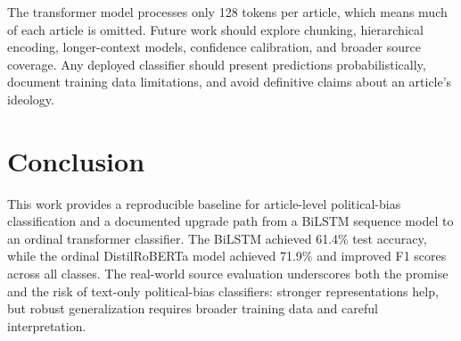 \documentclass[10pt,twocolumn]{article}
\begin{document}
The transformer model processes only 128 tokens per article, which means much
of each article is omitted. Future work should explore chunking, hierarchical
encoding, longer-context models, confidence calibration, and broader source
coverage. Any deployed classifier should present predictions probabilistically,
document training data limitations, and avoid definitive claims about an
article's ideology.

\section{Conclusion}

This work provides a reproducible baseline for article-level political-bias
classification and a documented upgrade path from a BiLSTM sequence model to an
ordinal transformer classifier. The BiLSTM achieved 61.4\% test accuracy, while
the ordinal DistilRoBERTa model achieved 71.9\% and improved F1 scores across
all classes. The real-world source evaluation underscores both the promise and
the risk of text-only political-bias classifiers: stronger representations help,
but robust generalization requires broader training data and careful
interpretation.



\end{document}

